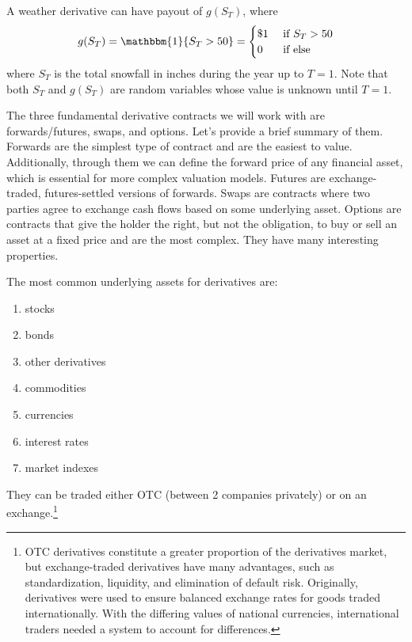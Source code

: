 \documentclass{article}
\begin{document}
  \begin{example}
    A weather derivative can have payout of $g(S_T)$, where 
    \begin{equation}
      g(S_T) = \mathbbm{1} \{S_T > 50\} = \begin{cases} \$1 & \text{ if } S_T > 50 \\ 0 & \text{ if else} \end{cases}
    \end{equation}
    where $S_T$ is the total snowfall in inches during the year up to $T = 1$. Note that both $S_T$ and $g(S_T)$ are random variables whose value is unknown until $T = 1$.
  \end{example}

  The three fundamental derivative contracts we will work with are forwards/futures, swaps, and options. Let's provide a brief summary of them. Forwards are the simplest type of contract and are the easiest to value. Additionally, through them we can define the forward price of any financial asset, which is essential for more complex valuation models. Futures are exchange-traded, futures-settled versions of forwards. Swaps are contracts where two parties agree to exchange cash flows based on some underlying asset. Options are contracts that give the holder the right, but not the obligation, to buy or sell an asset at a fixed price and are the most complex. They have many interesting properties. 

  The most common underlying assets for derivatives are: 
  \begin{enumerate}
    \item stocks
    \item bonds
    \item other derivatives 
    \item commodities
    \item currencies
    \item interest rates 
    \item market indexes 
  \end{enumerate}
  They can be traded either OTC (between 2 companies privately) or on an exchange.\footnote{OTC derivatives constitute a greater proportion of the derivatives market, but exchange-traded derivatives have many advantages, such as standardization, liquidity, and elimination of default risk. Originally, derivatives were used to ensure balanced exchange rates for goods traded internationally. With the differing values of national currencies, international traders needed a system to account for differences. }
\end{document}
